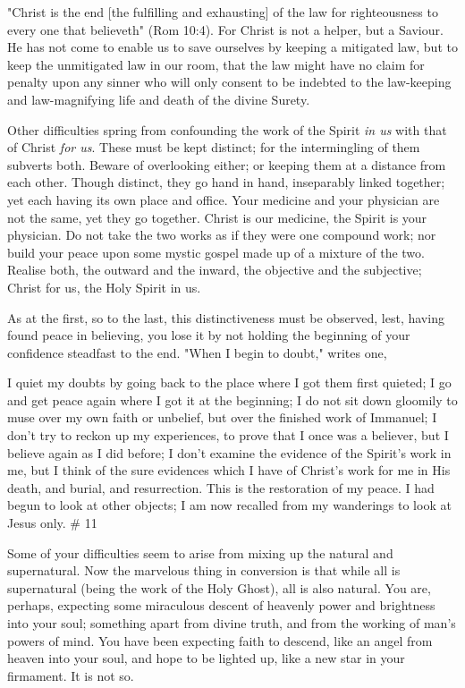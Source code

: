 \documentclass[
]{book}
\begin{document}
"Christ is the end {[}the fulfilling and exhausting{]} of the law for righteousness to every one that believeth" (Rom 10:4). For Christ is not a helper, but a Saviour. He has not come to enable us to save ourselves by keeping a mitigated law, but to keep the unmitigated law in our room, that the law might have no claim for penalty upon any sinner who will only consent to be indebted to the law-keeping and law-magnifying life and death of the divine Surety.

Other difficulties spring from confounding the work of the Spirit \emph{in us} with that of Christ \emph{for us}. These must be kept distinct; for the intermingling of them subverts both. Beware of overlooking either; or keeping them at a distance from each other. Though distinct, they go hand in hand, inseparably linked together; yet each having its own place and office. Your medicine and your physician are not the same, yet they go together. Christ is our medicine, the Spirit is your physician. Do not take the two works as if they were one compound work; nor build your peace upon some mystic gospel made up of a mixture of the two. Realise both, the outward and the inward, the objective and the subjective; Christ for us, the Holy Spirit in us.

As at the first, so to the last, this distinctiveness must be observed, lest, having found peace in believing, you lose it by not holding the beginning of your confidence steadfast to the end. "When I begin to doubt," writes one,

I quiet my doubts by going back to the place where I got them first quieted; I go and get peace again where I got it at the beginning; I do not sit down gloomily to muse over my own faith or unbelief, but over the finished work of Immanuel; I don't try to reckon up my experiences, to prove that I once was a believer, but I believe again as I did before; I don't examine the evidence of the Spirit's work in me, but I think of the sure evidences which I have of Christ's work for me in His death, and burial, and resurrection. This is the restoration of my peace. I had begun to look at other objects; I am now recalled from my wanderings to look at Jesus only.
\# 11

Some of your difficulties seem to arise from mixing up the natural and supernatural. Now the marvelous thing in conversion is that while all is supernatural (being the work of the Holy Ghost), all is also natural. You are, perhaps, expecting some miraculous descent of heavenly power and brightness into your soul; something apart from divine truth, and from the working of man's powers of mind. You have been expecting faith to descend, like an angel from heaven into your soul, and hope to be lighted up, like a new star in your firmament. It is not so.
\end{document}
